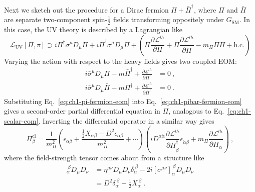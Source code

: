 Next we sketch out the procedure for a Dirac fermion
$\Pi + \bar{\Pi}^{\dagger}$, where $\Pi$ and $\bar{\Pi}$ are separate
two-component spin-$\tfrac{1}{2}$ fields transforming oppositely under
$G_{\text{SM}}$. In this case, the UV theory is described by a Lagrangian like
\begin{equation}
  \label{eq:ch1-fermion-lag}
  \mathscr{L}_{\text{UV}}[\Pi, \pi] \supset i \Pi^{\dagger} \bar{\sigma}^{\mu} D_{\mu} \Pi + i \bar{\Pi}^{\dagger} \bar{\sigma}^{\mu} D_{\mu} \bar{\Pi} + \left( \Pi \frac{\partial \mathscr{L}^{lh}}{\partial \Pi} + \bar{\Pi} \frac{\partial \mathscr{L}^{lh}}{\partial \bar{\Pi}} - m_{\Pi} \bar{\Pi} \Pi  + \text{h.c.} \right)
\end{equation}
Varying the action with respect to the heavy fields gives two coupled EOM:
\begin{align}
  i \bar{\sigma}^{\mu} D_{\mu} \Pi - m \bar{\Pi}^{\dagger} + \frac{\partial \mathscr{L}^{lh}}{\partial \Pi^{\dagger}} &= 0 \ , \label{eq:ch1-pi-fermion-eom} \\
  i \bar{\sigma}^{\mu} D_{\mu} \bar{\Pi} - m \Pi^{\dagger} + \frac{\partial \mathscr{L}^{lh}}{\partial \bar{\Pi}^{\dagger}} &= 0 \ . \label{eq:ch1-pibar-fermion-eom}
\end{align}
Substituting Eq.~\eqref{eq:ch1-pi-fermion-eom} into Eq.~\eqref{eq:ch1-pibar-fermion-eom}
gives a second-order partial differential equation in $\Pi$, analogous to
Eq.~\eqref{eq:ch1-scalar-eom}. Inverting the differential operator in a similar way
gives
\begin{equation}
  \label{eq:ch1-fermion-repl}
  \Pi^{\text{cl}}_{\beta} = \frac{1}{m_{\Pi}^{2}} \left( \epsilon_{\alpha \beta} + \frac{ \tfrac{1}{2} X_{\alpha \beta} - D^{2} \epsilon_{\alpha \beta}}{m_{\Pi}^{2}} + \cdots \right) \left( i D^{\alpha \dot{\alpha}} \frac{\partial \mathscr{L}^{lh}}{\partial \Pi^{\dagger}_{\dot{\beta}}} \epsilon_{\dot{\alpha} \dot{\beta}} + m_{\Pi} \frac{\partial \mathscr{L}^{lh}}{\partial \bar{\Pi}_{\alpha}} \right) \ ,
\end{equation}
where the field-strength tensor comes about from a structure like
\begin{align}
  [\sigma^{\mu} \bar{\sigma}^{\nu}]_{\alpha}^{\ \beta} D_{\mu} D_{\nu} &= \eta^{\mu\nu} D_{\mu} D_{\nu} \delta_{\alpha}^{\ \beta} - 2i [\sigma^{\mu\nu}]_{\alpha}^{\ \beta} D_{\mu} D_{\nu} \\
                                                                       &= D^{2} \delta_{\alpha}^{\ \beta} - \tfrac{1}{2} X_{\alpha}^{\ \beta} \ .
\end{align}
